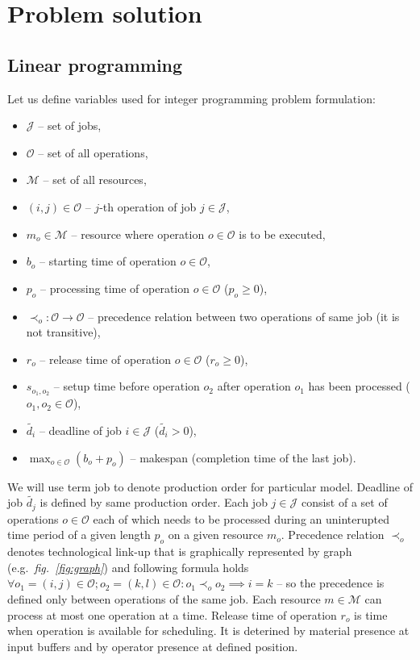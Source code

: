 \documentclass[a4paper,journal,twocolumn]{IEEEtran}
\begin{document}
\section{Problem solution}
\subsection{Linear programming}
Let us define variables used for integer programming problem formulation:
\begin{itemize}
	\item $\mathcal{J}$ -- set of jobs,
	\item $\mathcal{O}$ -- set of all operations,
	\item $\mathcal{M}$ -- set of all resources,
	\item $\left(i,j\right) \in \mathcal{O}$ -- $j$-th operation of job $j \in \mathcal{J}$,
	\item $m_{o}\in\mathcal{M}$ -- resource where operation $o\in\mathcal{O}$ is to be executed,
	\item $b_{o}$ -- starting time of operation $o\in\mathcal{O}$,
	\item $p_{o}$ --  processing time of operation $o\in\mathcal{O}$ ($p_{o}\ge 0$),
	\item $\prec_o : \mathcal{O} \rightarrow \mathcal{O}$ -- precedence relation between two operations of same job (it is not transitive),
	\item $r_{o}$ -- release time of operation $o\in\mathcal{O}$ ($r_{o} \ge 0$),
	\item $s_{o_1,o_2}$ -- setup time before operation $o_2$ after operation $o_1$
	has been processed ($o_1,o_2\in\mathcal{O}$),
	\item $\tilde{d_i}$ -- deadline of job $i\in\mathcal{J}$ ($\tilde{d_i}> 0$),
	\item $\max_{o\in\mathcal{O}} (b_o+p_o)$ -- makespan (completion time of the last job).
\end{itemize}

We will use term job to denote production order for particular model. Deadline of job $\tilde{d_j}$ is defined by same production order.
Each job $j\in\mathcal{J}$ consist of a set of operations $o\in\mathcal{O}$ each of which needs 
to be processed during an uninterupted time period of a given length $p_o$ on a given resource $m_o$.
Precedence relation $\prec_o$ denotes technological link-up that is graphically represented by graph 
(e.g.~\emph{fig.~\ref{fig:graph}}) and following formula holds 
$\forall o_1=(i,j)\in\mathcal{O};o_2=(k,l)\in\mathcal{O}: o_1\prec_oo_2 \implies i=k $ -- so the precedence is defined only between
operations of the same job.
Each resource $m\in\mathcal{M}$ can process at most one operation at a time.
Release time of operation $r_o$ is time when operation is available for scheduling. It is deterined by
material presence at input buffers and by operator presence at defined position.
\end{document}
